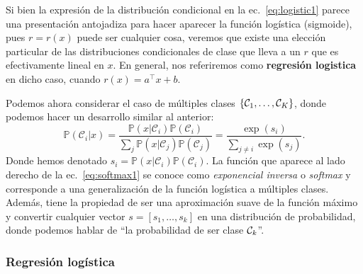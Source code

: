 \begin{remark} Si bien la expresión de la distribución condicional en la ec.~\eqref{eq:logistic1} parece una presentación antojadiza para hacer aparecer la  función logística (sigmoide), pues $r=r(x)$ puede ser cualquier cosa, veremos que existe una elección particular de las distribuciones condicionales de clase que lleva a un $r$ que es efectivamente lineal en $x$. En general, nos  referiremos como \textbf{regresión logistica} en dicho caso,  cuando $r(x) = a^\top x  + b$.
\end{remark} 

Podemos ahora considerar el caso de múltiples clases $\{{\mathcal C}_1,\ldots,{\mathcal C}_K\}$, donde podemos hacer un desarrollo similar al anterior:  
\begin{equation}
	\mathbb{P}(\mathcal{C}_i | x) = \frac{\mathbb{P}(x | \mathcal{C}_i)\mathbb{P}(\mathcal{C}_i)}{\sum_{j}\mathbb{P}(x | \mathcal{C}_j)\mathbb{P}(\mathcal{C}_j)} = \frac{\exp(s_i)}{\sum_{j\neq i}\exp(s_j)}.\label{eq:softmax1}
\end{equation}
Donde hemos denotado $s_i = \mathbb{P}(x | \mathcal{C}_i)\mathbb{P}(\mathcal{C}_i)$. La función que aparece al lado derecho de la  ec.~\eqref{eq:softmax1} se conoce como \emph{exponencial inversa} o \emph{softmax} y corresponde a una generalización de la función logística a múltiples clases. Además,  tiene la propiedad de ser una aproximación suave de la función máximo y convertir cualquier vector $s=[s_1,\ldots,s_k]$ en una distribución de probabilidad, donde podemos hablar de ``la probabilidad de ser clase ${\mathcal C}_k$''.

\subsubsection{Regresión logística} 
\label{sub:reg_log}

